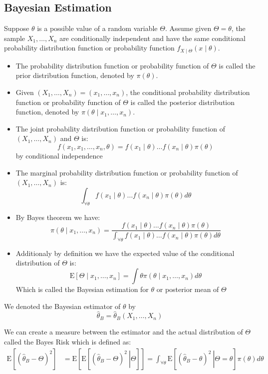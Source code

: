 \documentclass[english,12pt]{article}
\theoremstyle{plain}
\theoremstyle{definition}
\theoremstyle{definition} %
\newcommand{\ex}[1]{\mbox{E} \left[ #1 \right]}
\newcommand{\condex}[2]{\mbox{E} \left[ \left. #1 \ \right\vert \left. #2 \right. \right]}
\begin{document}
\subsection{Bayesian Estimation}
Suppose $\theta$ is a possible value of a random variable $\Theta$.  Assume given $\Theta=\theta$, the sample $X_1,\ldots,X_n$ are conditionally independent and have the same conditional probability distribution function or probability function $f_{X\mid\Theta}(x\mid\theta)$.
\begin{itemize}
\item The probability distribution function or probability function of $\Theta$ is called the prior distribution function, denoted by $\pi(\theta)$.
\item Given $(X_1,\ldots,X_n)=(x_1,\ldots,x_n)$, the conditional probability distribution function or probability function of $\Theta$ is called the posterior distribution function, denoted by $\pi(\theta\mid x_1,\ldots,x_n)$.
\item The joint probability distribution function or probability function of $(X_1,\ldots,X_n)$ and $\Theta$ is:
\[f(x_1,x_1,\ldots,x_n,\theta)=f(x_1\mid\theta)\ldots f(x_n\mid\theta)\pi(\theta)\]
by conditional independence
\item The marginal probability distribution function or probability function of $(X_1,\ldots,X_n)$ is:
\[\int_{\forall\theta}f(x_1\mid\theta)\ldots f(x_n\mid\theta)\pi(\theta)d\theta\]
\item By Bayes theorem we have:
\[\pi(\theta\mid x_1,\ldots,x_n)=\frac{f(x_1\mid\theta)\ldots f(x_n\mid\theta)\pi(\theta)}{\int_{\forall\theta}f(x_1\mid\theta)\ldots f(x_n\mid\theta)\pi(\theta)d\theta}\]
\item Additionaly by definition we have the expected value of the conditional distribution of $\Theta$ is:
\[\ex{\Theta\mid x_1,\ldots,x_n}=\int\theta\pi(\theta\mid x_1,\ldots,x_n)d\theta\]
Which is called the Bayesian estimation for $\theta$ or posterior mean of $\Theta$
\end{itemize}

We denoted the Bayesian estimator of $\theta$ by
\[\hat\theta_B=\hat\theta_B(X_1,\ldots,X_n)\]

We can create a measure between the estimator and the actual distribution of $\Theta$ called the Bayes Risk which is defined as:
\begin{align*}
\ex{(\hat\theta_B-\Theta)^2}
&=\ex{\condex{(\hat\theta_B-\Theta)^2}{\Theta}}
=\int_{\forall\theta} \condex{(\hat\theta_B-\theta)^2}{\Theta=\theta}\pi(\theta)d\theta
\end{align*}
\end{document}
